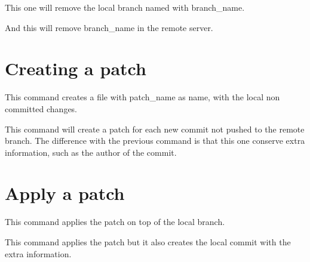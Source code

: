 This one will remove the local branch named with branch\_name.

\noindent{}

And this will remove branch\_name in the remote server.

\section*{Creating a patch}

\noindent{}

This command creates a file with patch\_name as name, with the local non committed changes.

\noindent{}

This command will create a patch for each new commit not pushed to the remote branch. The difference with the previous command is that this one conserve extra information, such as the author of the commit.

\newpage
\section*{Apply a patch}

\noindent{}

This command applies the patch on top of the local branch.

\noindent{}

This command applies the patch but it also creates the local commit with the extra information.

